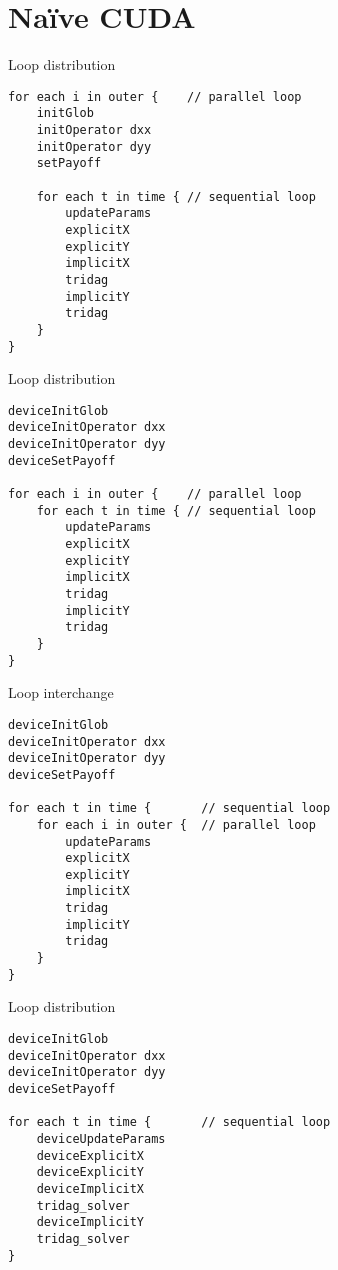 \documentclass[14pt,t,english]{beamer}
\begin{document}
\section{Na\"ive CUDA}
%
\begin{frame}[c,fragile]{Loop distribution}
\begingroup
	\fontsize{10pt}{12pt}\selectfont
\begin{verbatim}
for each i in outer {    // parallel loop
    initGlob
    initOperator dxx
    initOperator dyy
    setPayoff

    for each t in time { // sequential loop
        updateParams
        explicitX
        explicitY
        implicitX
        tridag
        implicitY
        tridag
    }
}
\end{verbatim}
\endgroup
\end{frame}
%
\begin{frame}[c,fragile]{Loop distribution}
\begingroup
	\fontsize{10pt}{12pt}\selectfont
\begin{verbatim}
deviceInitGlob
deviceInitOperator dxx
deviceInitOperator dyy
deviceSetPayoff

for each i in outer {    // parallel loop
    for each t in time { // sequential loop
        updateParams
        explicitX
        explicitY
        implicitX
        tridag
        implicitY
        tridag
    }
}
\end{verbatim}
\endgroup
\end{frame}
%
\begin{frame}[c,fragile]{Loop interchange}
\begingroup
	\fontsize{10pt}{12pt}\selectfont
\begin{verbatim}
deviceInitGlob
deviceInitOperator dxx
deviceInitOperator dyy
deviceSetPayoff

for each t in time {       // sequential loop
    for each i in outer {  // parallel loop
        updateParams
        explicitX
        explicitY
        implicitX
        tridag
        implicitY
        tridag
    }
}
\end{verbatim}
\endgroup
\end{frame}
%
\begin{frame}[c,fragile]{Loop distribution}
\begingroup
	\fontsize{10pt}{12pt}\selectfont
\begin{verbatim}
deviceInitGlob
deviceInitOperator dxx
deviceInitOperator dyy
deviceSetPayoff

for each t in time {       // sequential loop
    deviceUpdateParams
    deviceExplicitX
    deviceExplicitY
    deviceImplicitX
    tridag_solver
    deviceImplicitY
    tridag_solver
}
\end{verbatim}
\endgroup
\end{frame}
%
\end{document}
